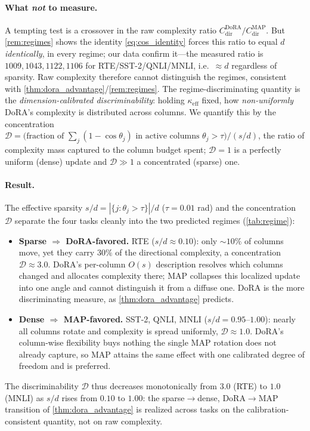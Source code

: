 \documentclass[11pt]{article}
\begin{document}
\paragraph{What \emph{not} to measure.} A tempting test is a crossover in the raw
complexity ratio $C^{\mathrm{DoRA}}_{\mathrm{dir}}/C^{\mathrm{MAP}}_{\mathrm{dir}}$. But
\cref{rem:regimes} shows the identity \eqref{eq:cos_identity} forces this ratio to
equal $d$ \emph{identically}, in every regime; our data confirm it---the measured
ratio is $1009,1043,1122,1106$ for RTE/SST-2/QNLI/MNLI, i.e.\ ${\approx}d$ regardless
of sparsity. Raw complexity therefore cannot distinguish the regimes, consistent with
\cref{thm:dora_advantage}/\cref{rem:regimes}. The regime-discriminating quantity is the
\emph{dimension-calibrated discriminability}: holding $\kappa_{\mathrm{eff}}$ fixed,
how \emph{non-uniformly} DoRA's complexity is distributed across columns. We quantify
this by the concentration
$\mathcal{D}=\big(\text{fraction of }\sum_j(1-\cos\theta_j)\text{ in active columns }\theta_j>\tau\big)\big/(s/d)$,
the ratio of complexity mass captured to the column budget spent; $\mathcal{D}{=}1$ is
a perfectly uniform (dense) update and $\mathcal{D}{\gg}1$ a concentrated (sparse) one.

\paragraph{Result.} The effective sparsity $s/d=|\{j:\theta_j>\tau\}|/d$ ($\tau{=}0.01$
rad) and the concentration $\mathcal{D}$ separate the four tasks cleanly into the two
predicted regimes (\cref{tab:regime}):
\begin{itemize}\itemsep1pt
\item \textbf{Sparse $\Rightarrow$ DoRA-favored.} RTE ($s/d\approx0.10$): only
${\sim}10\%$ of columns move, yet they carry $30\%$ of the directional complexity, a
concentration $\mathcal{D}\approx3.0$. DoRA's per-column $O(s)$ description resolves
which columns changed and allocates complexity there; MAP collapses this localized
update into one angle and cannot distinguish it from a diffuse one. DoRA is the more
discriminating measure, as \cref{thm:dora_advantage} predicts.
\item \textbf{Dense $\Rightarrow$ MAP-favored.} SST-2, QNLI, MNLI ($s/d=0.95$--$1.00$):
nearly all columns rotate and complexity is spread uniformly, $\mathcal{D}\approx1.0$.
DoRA's column-wise flexibility buys nothing the single MAP rotation does not already
capture, so MAP attains the same effect with one calibrated degree of freedom and is
preferred.
\end{itemize}
The discriminability $\mathcal{D}$ thus decreases monotonically from $3.0$ (RTE) to
$1.0$ (MNLI) as $s/d$ rises from $0.10$ to $1.00$: the sparse$\to$dense,
DoRA$\to$MAP transition of \cref{thm:dora_advantage} is realized across tasks on the
calibration-consistent quantity, not on raw complexity.
\end{document}
